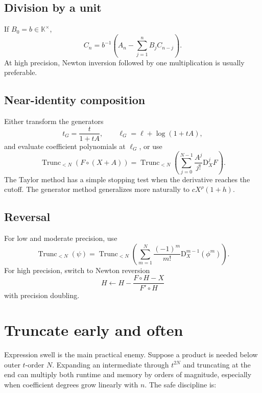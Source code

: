 \documentclass[11pt,oneside,openany]{book}
\newcommand{\K}{\mathbb{K}}
\newcommand{\TransseriesTruncateBelow}[2]{%
  \operatorname{Trunc}_{<#2}\!\left(#1\right)%
}
\newcommand{\compose}{\mathbin{\circ}}
\newcommand{\D}{\mathrm{D}}
\begin{document}
\subsection{Division by a unit}
If \(B_0=b\in\K^\times\),
\begin{equation}\label{eq:algdivcoeff}
 C_n=b^{-1}\left(A_n-\sum_{j=1}^{n}B_jC_{n-j}\right).
\end{equation}
At high precision, Newton inversion followed by one multiplication is usually
preferable.

\subsection{Near-identity composition}
Either transform the generators
\begin{equation}\label{eq:alggenerators}
 t_G=\frac{t}{1+tA},
 \qquad
 \ell_G=\ell+\log(1+tA),
\end{equation}
and evaluate coefficient polynomials at \(\ell_G\), or use
\begin{equation}\label{eq:algtaylor}
 \TransseriesTruncateBelow{F\compose(X+A)}{N}=
 \TransseriesTruncateBelow{
   \sum_{j=0}^{N-1}\frac{A^j}{j!}\D_X^jF}{N}.
\end{equation}
The Taylor method has a simple stopping test when the derivative reaches the
cutoff.  The generator method generalizes more naturally to
\(cX^\rho(1+h)\).

\subsection{Reversal}
For low and moderate precision, use
\begin{equation}\label{eq:algreverseLagrange}
 \TransseriesTruncateBelow{\psi}{N}=
 \TransseriesTruncateBelow{
   \sum_{m=1}^{N}\frac{(-1)^m}{m!}\D_X^{m-1}(\phi^m)}{N}.
\end{equation}
For high precision, switch to Newton reversion
\begin{equation}\label{eq:algreverseNewton}
 H\leftarrow H-\frac{F\compose H-X}{F'\compose H}
\end{equation}
with precision doubling.

\section{Truncate early and often}
Expression swell is the main practical enemy.  Suppose a product is needed
below outer \(t\)-order \(N\).  Expanding an intermediate through \(t^{2N}\) and truncating at
the end can multiply both runtime and memory by orders of magnitude, especially
when coefficient degrees grow linearly with \(n\).  The safe discipline is:
\end{document}
